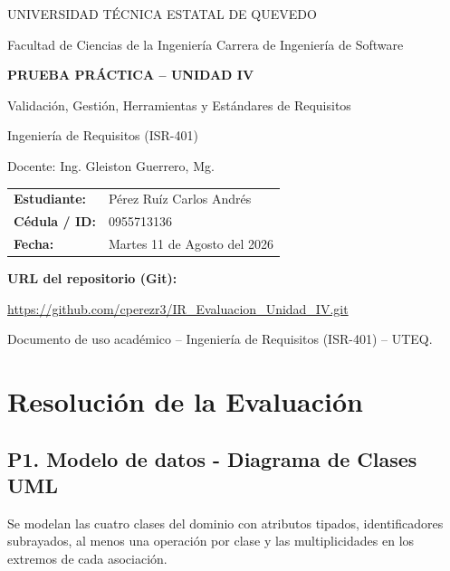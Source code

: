 \documentclass[11pt]{article}
\begin{document}
\begin{titlepage}
\centering
\vspace*{0.6cm}

{\large UNIVERSIDAD TÉCNICA ESTATAL DE QUEVEDO\par}
{\normalsize Facultad de Ciencias de la Ingeniería \textbullet{} Carrera de Ingeniería de Software\par}
\vspace{0.7cm}

{\Huge\bfseries\color{azulUTEQ} PRUEBA PRÁCTICA -- UNIDAD IV\par}
\vspace{0.3cm}
{\Large Validación, Gestión, Herramientas y Estándares de Requisitos\par}
\vspace{0.4cm}
{\large Ingeniería de Requisitos (ISR-401)\par}
{\large Docente: Ing. Gleiston Guerrero, Mg.\par}

\vspace{1cm}
\begin{tabular}{ll}
\textbf{Estudiante:} & Pérez Ruíz Carlos Andrés \\[0.4cm]
\textbf{Cédula / ID:} & 0955713136 \\[0.4cm]
\textbf{Fecha:} & Martes 11 de Agosto del 2026 \\[0.4cm]
\end{tabular}

\vspace{1cm}
{\bfseries URL del repositorio (Git):}\par
\vspace{0.3cm}
\url{https://github.com/cperezr3/IR_Evaluacion_Unidad_IV.git}

\vfill
{\small Documento de uso académico -- Ingeniería de Requisitos (ISR-401) -- UTEQ.\par}
\end{titlepage}

\section*{Resolución de la Evaluación}

\subsection*{P1. Modelo de datos - Diagrama de Clases UML}
Se modelan las cuatro clases del dominio con atributos tipados, identificadores subrayados, al menos una
operación por clase y las multiplicidades en los extremos de cada asociación.
\end{document}
